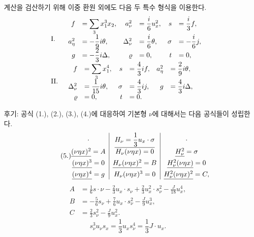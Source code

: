 계산을 검산하기 위해 \glqq{}이중 환원\grqq{} 외에도 다음 두 특수 형식을 이용한다.
\[
\begin{array}{ll}
\text{I.}&\begin{array}{rlrlrl}
f&=\displaystyle\sum_3x_1^3x_2,& a_\nu^2&=\dfrac{i}{6}u_x^2,& s&=\dfrac{i}{3}f,\\
a_\eta^2&=-\dfrac19i\theta,& \Delta_\nu^2&=\dfrac{i}{6}\theta,& \sigma&=-\dfrac{i}{6}j,\\
g&=-\dfrac23i\Delta,& \varrho&=0,& t&=0,
\end{array}\\[1.2em]
\text{II.}&\begin{array}{rlrlrl}
f&=\displaystyle\sum_3x_1^4,& s&=\dfrac43if,& a_\eta^2&=\dfrac29i\theta,\\
\Delta_\nu^2&=\dfrac1{15}i\theta,& \sigma&=\dfrac43ij,& g&=\dfrac43i\Delta,\\
\varrho&=0,& t&=0.
\end{array}
\end{array}
\]

후기: 공식 (1.), (2.), (3.), (4.)에 대응하여 기본형 $\nu$에 대해서는 다음 공식들이 성립한다.
\[
\tag{5.}
\begin{array}{@{}c|c|c@{}}
\cdot & \underline{H_\nu=\dfrac13u_x\cdot\sigma} & \cdot\\[0.45em]
\underline{(\nu\eta x)^2}=A & H_\nu(\nu\eta x)=0 & \underline{H_\nu^2}=\sigma\\[0.45em]
\underline{(\nu\eta x)^3}=0 & \underline{H_\nu(\nu\eta x)^2}=B & \underline{H_\nu^2(\nu\eta x)}=0\\[0.45em]
\underline{(\nu\eta x)^4}=g & H_\nu(\nu\eta x)^3=0 & \underline{H_\nu^2(\nu\eta x)^2}=C,
\end{array}
\]
\[
\begin{aligned}
A&=\frac16s\cdot\nu-\frac23u_x\cdot s_\nu+\frac23u_x^2\cdot s_\nu^2-\frac{J}{18}u_x^4,\\
B&=-\frac56s_\nu+\frac76u_x\cdot s_\nu^2-\frac{J}{9}u_x^3,\\
C&=\frac23s_\nu^2-\frac{J}{9}u_x^2.
\end{aligned}
\]
\[
\tag{6.}
s_\nu^3u_\nu s_x=\frac13u_xs_\nu^4=\frac13J\cdot u_x.
\]

